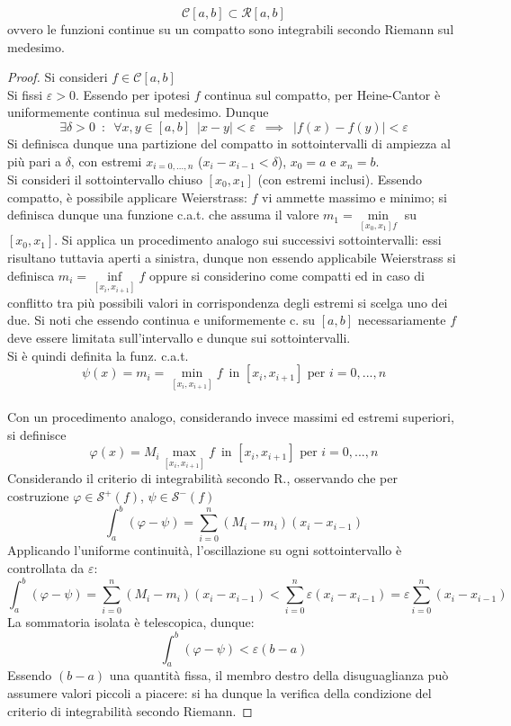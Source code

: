 \documentclass[10pt, oneside]{book}
\theoremstyle{plain}
\begin{document}
\begin{ther}
    \[\mathcal{C}[a,b] \subset \mathcal{R}[a,b]\]
    ovvero le funzioni continue su un compatto sono integrabili secondo Riemann sul medesimo.
\end{ther}
\begin{proof}
    Si consideri $f \in \mathcal{C}[a,b]$
    \\Si fissi $\varepsilon > 0$. Essendo per ipotesi $f$ continua sul compatto, per Heine-Cantor è uniformemente continua sul medesimo. Dunque
    \[\exists \delta > 0 \enspace : \enspace \forall x,y \in [a,b] \enspace |x-y| < \varepsilon \enspace \implies \enspace |f(x) - f(y)| < \varepsilon\]
    Si definisca dunque una partizione del compatto in sottointervalli di ampiezza al più pari a $\delta$, con estremi $x_{i = 0, ..., n}$ ($x_i - x_{i-1} < \delta$), $x_0 = a$ e $x_n = b$.
    \\Si consideri il sottointervallo chiuso $[x_0, x_1]$ (con estremi inclusi). Essendo compatto, è possibile applicare Weierstrass: $f$ vi ammette massimo e minimo; si definisca dunque una funzione c.a.t. che assuma il valore $m_1 = \min\limits_{[x_0, x_1] f}$ su $[x_0, x_1]$. Si applica un procedimento analogo sui successivi sottointervalli: essi risultano tuttavia aperti a sinistra, dunque non essendo applicabile Weierstrass si definisca $m_i = \inf\limits_{[x_i, x_{i+1}]} f$ oppure si considerino come compatti ed in caso di conflitto tra più possibili valori in corrispondenza degli estremi si scelga uno dei due. Si noti che essendo continua e uniformemente c. su $[a,b]$ necessariamente $f$ deve essere limitata sull'intervallo e dunque sui sottointervalli.
    \\Si è quindi definita la funz. c.a.t.
    \[\psi(x) = m_i = \min \limits_{[x_i, x_{i+1}]} f \enspace \textrm{in $[x_i, x_{i+1}]$ per $i = 0, ..., n$}\]
    \\Con un procedimento analogo, considerando invece massimi ed estremi superiori, si definisce 
    \[\varphi(x) = M_i \max \limits_{[x_i, x_{i+1}]} f \enspace \textrm{in $[x_i, x_{i+1}]$ per $i = 0, ..., n$}\]
    Considerando il criterio di integrabilità secondo R., osservando che per costruzione $\varphi \in \mathcal{S}^+(f)$, $\psi \in \mathcal{S}^-(f)$
    \[\int_a^b (\varphi - \psi) = \sum\limits_{i=0}^n (M_i - m_i) (x_i - x_{i-1})\]
    Applicando l'uniforme continuità, l'oscillazione su ogni sottointervallo è controllata da $\varepsilon$:
    \[\int_a^b (\varphi - \psi) = \sum\limits_{i=0}^n (M_i - m_i) (x_i - x_{i-1}) < \sum\limits_{i=0}^n \varepsilon (x_i - x_{i-1}) = \varepsilon \sum\limits_{i=0}^n (x_i - x_{i-1})\]
    La sommatoria isolata è telescopica, dunque:
    \[\int_a^b (\varphi - \psi) < \varepsilon (b - a)\]
    Essendo $(b - a)$ una quantità fissa, il membro destro della disuguaglianza può assumere valori piccoli a piacere: si ha dunque la verifica della condizione del criterio di integrabilità secondo Riemann.
\end{proof}
\end{document}
